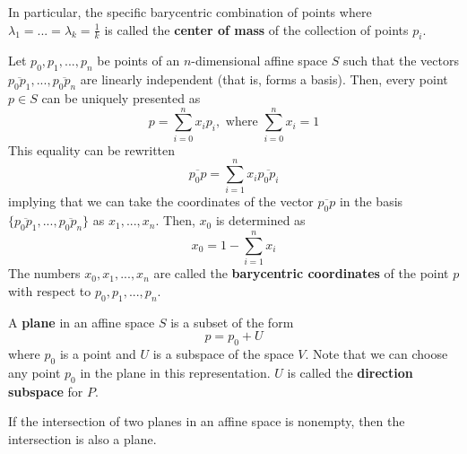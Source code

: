   \begin{definition}
    \label{def:center-of-mass}
    In particular, the specific barycentric combination of points where $\lambda_1 = ... = \lambda_k = \frac{1}{k}$ is called the \textbf{center of mass} of the collection of points $p_i$. 
  \end{definition}

  \begin{definition}
    \label{def:barycentric-coordinates}
    Let $p_0, p_1, ..., p_n$ be points of an $n$-dimensional affine space $S$ such that the vectors $\overline{p_0 p_1}, ..., \overline{p_0 p_n}$ are linearly independent (that is, forms a basis). Then, every point $p \in S$ can be uniquely presented as 
    \begin{equation}
      p = \sum_{i=0}^n x_i p_i, \text{ where } \sum_{i=0}^n x_i = 1
    \end{equation}
    This equality can be rewritten
    \begin{equation}
      \overline{p_0 p} = \sum_{i=1}^n x_i \overline{p_0 p_i}
    \end{equation}
    implying that we can take the coordinates of the vector $\overline{p_0 p}$ in the basis $\{ \overline{p_0 p_1}, ..., \overline{p_0 p_n}\}$ as $x_1, ..., x_n$. Then, $x_0$ is determined as 
    \begin{equation}
      x_0 = 1 - \sum_{i=1}^n x_i
    \end{equation}
    The numbers $x_0, x_1, ..., x_n$ are called the \textbf{barycentric coordinates} of the point $p$ with respect to $p_0, p_1, ..., p_n$. 
  \end{definition}

  \begin{definition}
    \label{def:plane-in-an-affine-space}
    A \textbf{plane} in an affine space $S$ is a subset of the form 
    \begin{equation}
      p = p_0 + U
    \end{equation}
    where $p_0$ is a point and $U$ is a subspace of the space $V$. Note that we can choose any point $p_0$ in the plane in this representation. $U$ is called the \textbf{direction subspace} for $P$. 
  \end{definition}

  \begin{lemma}
    \label{thm:intersection-of-two-planes}
    If the intersection of two planes in an affine space is nonempty, then the intersection is also a plane. 
  \end{lemma}

